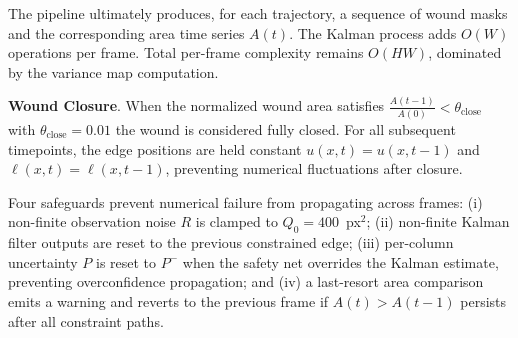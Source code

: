 The pipeline ultimately produces, for each trajectory, a sequence of wound masks and the corresponding area time series $A(t)$. The Kalman process adds $O(W)$ operations per frame. Total per-frame complexity remains $O(HW)$, dominated by the variance map computation.

 
\textbf{Wound Closure}.
When the normalized wound area satisfies $\frac{A(t-1)}{A(0)} < \theta_\text{close}$ with $\theta_\text{close} = 0.01$ the wound is considered fully closed. For all subsequent timepoints, the edge positions are held constant $u(x,t) = u(x,t-1)$ and $ \ell(x,t) = \ell(x,t-1)$, preventing numerical fluctuations after closure.
 

Four safeguards prevent numerical failure from propagating across frames:
(i) non-finite observation noise $R$ is clamped to $Q_0 = 400$~px$^2$;
(ii) non-finite Kalman filter outputs are reset to the previous constrained edge;
(iii) per-column uncertainty $P$ is reset to $P^-$ when the safety net overrides the Kalman
estimate, preventing overconfidence propagation; and
(iv) a last-resort area comparison emits a warning  and reverts to the previous
frame if $A(t) > A(t-1)$ persists after all constraint paths.



%
%
%
%
%
%



